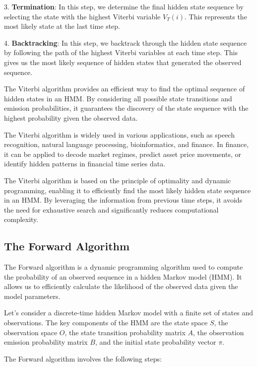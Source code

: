 \documentclass[a4paper,11pt]{article}
\begin{document}
3. \textbf{Termination}: In this step, we determine the final hidden state sequence by selecting the state with the highest Viterbi variable $V_{T}(i)$. This represents the most likely state at the last time step.

4. \textbf{Backtracking}: In this step, we backtrack through the hidden state sequence by following the path of the highest Viterbi variables at each time step. This gives us the most likely sequence of hidden states that generated the observed sequence.

The Viterbi algorithm provides an efficient way to find the optimal sequence of hidden states in an HMM. By considering all possible state transitions and emission probabilities, it guarantees the discovery of the state sequence with the highest probability given the observed data.

The Viterbi algorithm is widely used in various applications, such as speech recognition, natural language processing, bioinformatics, and finance. In finance, it can be applied to decode market regimes, predict asset price movements, or identify hidden patterns in financial time series data.

The Viterbi algorithm is based on the principle of optimality and dynamic programming, enabling it to efficiently find the most likely hidden state sequence in an HMM. By leveraging the information from previous time steps, it avoids the need for exhaustive search and significantly reduces computational complexity.


\subsection{The Forward Algorithm}
\label{sec:forward}

The Forward algorithm is a dynamic programming algorithm used to compute the probability of an observed sequence in a hidden Markov model (HMM). It allows us to efficiently calculate the likelihood of the observed data given the model parameters.

Let's consider a discrete-time hidden Markov model with a finite set of states and observations. The key components of the HMM are the state space $S$, the observation space $O$, the state transition probability matrix $A$, the observation emission probability matrix $B$, and the initial state probability vector $\pi$.

The Forward algorithm involves the following steps:
\end{document}
